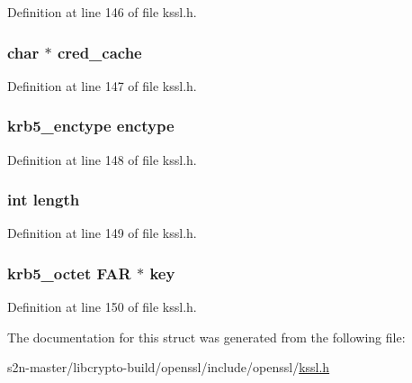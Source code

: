 Definition at line 146 of file kssl.\+h.

\subsubsection[{\texorpdfstring{cred\+\_\+cache}{cred_cache}}]{\setlength{\rightskip}{0pt plus 5cm}char $\ast$ cred\+\_\+cache}\hypertarget{structkssl__ctx__st_a4c907c639ed4624a5348145aad528ac5}{}\label{structkssl__ctx__st_a4c907c639ed4624a5348145aad528ac5}


Definition at line 147 of file kssl.\+h.

\subsubsection[{\texorpdfstring{enctype}{enctype}}]{\setlength{\rightskip}{0pt plus 5cm}krb5\+\_\+enctype enctype}\hypertarget{structkssl__ctx__st_a124c9f8f81b5b087393178d2e6db691e}{}\label{structkssl__ctx__st_a124c9f8f81b5b087393178d2e6db691e}


Definition at line 148 of file kssl.\+h.

\subsubsection[{\texorpdfstring{length}{length}}]{\setlength{\rightskip}{0pt plus 5cm}int length}\hypertarget{structkssl__ctx__st_a9f59b34b1f25fe00023291b678246bcc}{}\label{structkssl__ctx__st_a9f59b34b1f25fe00023291b678246bcc}


Definition at line 149 of file kssl.\+h.

\subsubsection[{\texorpdfstring{key}{key}}]{\setlength{\rightskip}{0pt plus 5cm}krb5\+\_\+octet {\bf F\+AR} $\ast$ key}\hypertarget{structkssl__ctx__st_af9dca1d1ed84c8f4ac054667cd04615b}{}\label{structkssl__ctx__st_af9dca1d1ed84c8f4ac054667cd04615b}


Definition at line 150 of file kssl.\+h.



The documentation for this struct was generated from the following file\+:\begin{DoxyCompactItemize}
\item 
s2n-\/master/libcrypto-\/build/openssl/include/openssl/\hyperlink{include_2openssl_2kssl_8h}{kssl.\+h}\end{DoxyCompactItemize}
